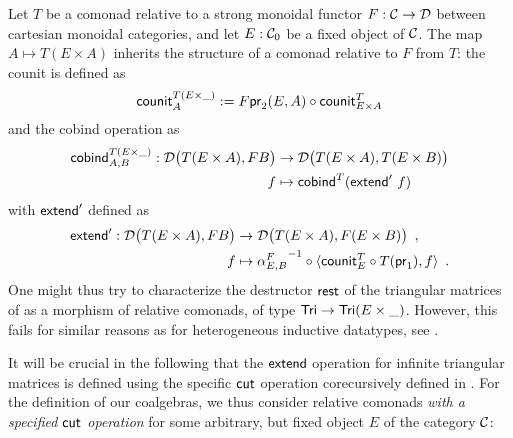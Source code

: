 \documentclass{amsart}
\begin{document}
\begin{remark}
  Let $T$ be a comonad relative to a strong monoidal functor $F:\C\to\D$ between cartesian monoidal categories,
  and let $E:\C_0$ be a fixed object of $\C$.
 The map $A\mapsto T(E\times A)$ inherits the structure of a comonad relative to $F$ from $T$: the 
 counit is defined as
   \[ \counit^{T(E\times \_)}_A := \comp{\counit^T_{E\times A}}{F\pr_2(E,A)} \]
  and the cobind operation as
   \begin{align*} 
            \cobind^{T(E\times \_)}_{A,B} : \D\bigl(T(E\times A),FB\bigr) &\to \D\bigl(T(E\times A),T(E\times B)\bigr) \\
              f &\mapsto  \cobind^T(\extend'~f)
   \end{align*}
  with $\extend'$ defined as 
  \begin{align*} \extend' : \D\bigl(T(E\times A),FB\bigr) &\to \D\bigl(T(E\times A), F(E\times B)\bigr) \enspace , \\ 
                                            f & \mapsto \comp{\langle \comp{T(\pr_1)}{\counit^T_E}, f \rangle}{{\alpha^{F}_{E,B}}^{-1}} \enspace .
  \end{align*}
 One might thus try to characterize the destructor $\tail$ of the triangular matrices of 
 as a morphism of relative comonads, of type $\Tri \to \Tri(E\times \_)$.
 However, this fails for similar reasons as for heterogeneous inductive datatypes, see \parencite[Ex.\ 3.18]{ahrens_zsido}.
\end{remark}


It will be crucial in the following that the $\extend$ operation for infinite triangular matrices is defined using the specific
$\cut$ operation corecursively defined in . 
For the definition of our coalgebras, we thus consider relative comonads \emph{with a specified $\cut$ operation} for some arbitrary,
but fixed object $E$ of the category $\C$:


\end{document}
